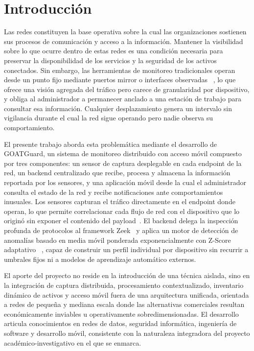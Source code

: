 \section{Introducción}
Las redes constituyen la base operativa sobre la cual las 
organizaciones sostienen sus procesos de comunicación y acceso a la 
información. Mantener la visibilidad sobre lo que ocurre dentro de estas 
redes es una condición necesaria para preservar la disponibilidad de los 
servicios y la seguridad de los activos conectados. Sin embargo, las 
herramientas de monitoreo tradicionales operan desde un punto fijo 
mediante puertos mirror o interfaces observadas
~\cite{kurose2010redes}, lo que ofrece una visión agregada del tráfico 
pero carece de granularidad por dispositivo, y obliga al administrador 
a permanecer anclado a una estación de trabajo para consultar esa 
información. Cualquier desplazamiento genera un intervalo sin vigilancia 
durante el cual la red sigue operando pero nadie observa su 
comportamiento.

El presente trabajo aborda esta problemática mediante el desarrollo de 
GOATGuard, un sistema de monitoreo distribuido con acceso móvil 
compuesto por tres componentes: un sensor de captura desplegable en 
cada endpoint de la red, un backend centralizado que recibe, procesa y 
almacena la información reportada por los sensores, y una aplicación 
móvil desde la cual el administrador consulta el estado de la red y 
recibe notificaciones ante comportamientos inusuales. Los sensores 
capturan el tráfico directamente en el endpoint donde operan, lo que 
permite correlacionar cada flujo de red con el dispositivo que lo 
originó sin exponer el contenido del payload~\cite{stevens2004unix}. 
El backend delega la inspección profunda de protocolos al framework 
Zeek~\cite{paxson1999zeek} y aplica un motor de detección de anomalías 
basado en media móvil ponderada exponencialmente con Z-Score adaptativo 
~\cite{hunter1986ewma}, capaz de construir un perfil individual por 
dispositivo sin recurrir a umbrales fijos ni a modelos de aprendizaje 
automático externos.

El aporte del proyecto no reside en la introducción de una técnica 
aislada, sino en la integración de captura distribuida, procesamiento 
contextualizado, inventario dinámico de activos y acceso móvil fuera 
de una arquitectura unificada, orientada a redes de pequeña y mediana 
escala donde las alternativas comerciales resultan económicamente 
inviables u operativamente sobredimensionadas. El desarrollo articula 
conocimientos en redes de datos, seguridad informática, ingeniería de 
software y desarrollo móvil, consistente con la naturaleza integradora 
del proyecto académico-investigativo en el que se enmarca.